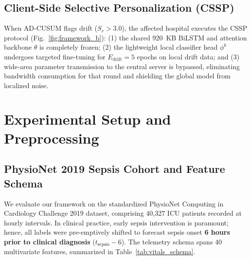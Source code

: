 \documentclass{llncs}
\begin{document}
\subsection{Client-Side Selective Personalization (CSSP)}
When AD-CUSUM flags drift ($S_r > 3.0$), the affected hospital executes the CSSP protocol (Fig.~\ref{fig:framework_b}): (1) the shared 920~KB BiLSTM and attention backbone $\theta$ is completely frozen; (2) the lightweight local classifier head $\phi^k$ undergoes targeted fine-tuning for $E_{\text{drift}} = 5$ epochs on local drift data; and (3) wide-area parameter transmission to the central server is bypassed, eliminating bandwidth consumption for that round and shielding the global model from localized noise.

\section{Experimental Setup and Preprocessing}
\label{sec:experiments}

\subsection{PhysioNet 2019 Sepsis Cohort and Feature Schema}
We evaluate our framework on the standardized PhysioNet Computing in Cardiology Challenge 2019 dataset, comprising 40,327 ICU patients recorded at hourly intervals. In clinical practice, early sepsis intervention is paramount; hence, all labels were pre-emptively shifted to forecast sepsis onset \textbf{6 hours prior to clinical diagnosis} ($t_{\text{sepsis}} - 6$). The telemetry schema spans 40 multivariate features, summarized in Table~\ref{tab:vitals_schema}.

\begin{table}[t]
\caption{Clinical physiological vital signs and laboratory feature schema.}\label{tab:vitals_schema}
\centering
\scriptsize
{}
\end{table}
\end{document}
